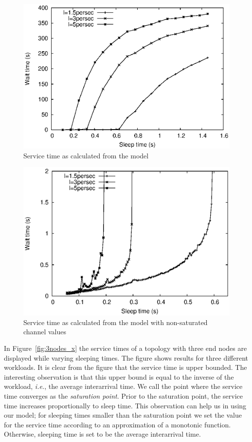 \begin{figure}[t]
\centering
\includegraphics[scale=0.65]{figures/3node_varySleep_sim_large.eps}
\caption{Service time as calculated from the model}
\label{fig:3nodes_large}
\end{figure}

\begin{figure}[t]
\centering
\includegraphics[scale=0.65]{figures/3node_varySleep_sim_small.eps}
\caption{Service time as calculated from the model with non-saturated channel values}
\label{fig:3nodes_small}
\end{figure}

In Figure~\ref{fig:3nodes_x} the service times of a topology with three end nodes are displayed while varying sleeping times. The figure shows results for three different workloads. It is clear from the figure that the service time is upper bounded. The interesting observation is that this upper bound is equal to the inverse of the workload, \emph{i.e.}, the average interarrival time. We call the point where the service time converges as the \emph{saturation point}. Prior to the saturation point, the service time increases proportionally to sleep time. This observation can help us in using our model; for sleeping times smaller than the saturation point we set the value for the service time according to an approximation of a monotonic function. Otherwise, sleeping time is set to be the average interarrival time.

